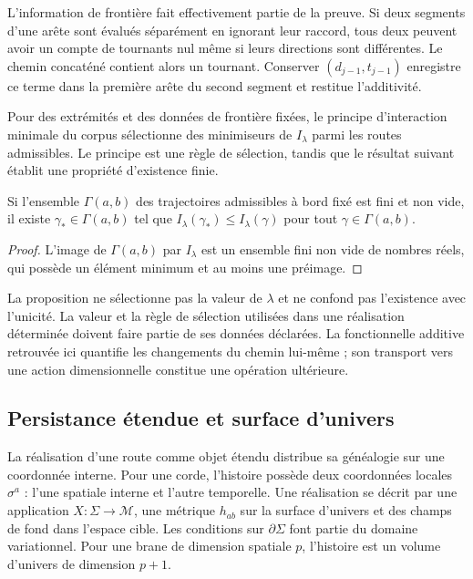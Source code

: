 L’information de frontière fait effectivement partie de la preuve.
Si deux segments d’une arête sont évalués séparément
en ignorant leur raccord, tous deux peuvent avoir un compte
de tournants nul même si leurs directions sont différentes. Le
chemin concaténé contient alors un tournant. Conserver
\((d_{j-1},t_{j-1})\) enregistre ce terme dans la première
arête du second segment et restitue l’additivité.

Pour des extrémités et des données de frontière fixées, le principe
d’interaction minimale du corpus sélectionne des minimiseurs de
\(I_\lambda\) parmi les routes admissibles. Le principe
est une règle de sélection, tandis que le résultat
suivant établit une propriété d’existence finie.

\begin{proposition}
Si l’ensemble \(\Gamma(a,b)\) des trajectoires admissibles
à bord fixé est fini et non vide, il existe
\(\gamma_*\in\Gamma(a,b)\) tel que
\(I_\lambda(\gamma_*)\leq I_\lambda(\gamma)\)
pour tout \(\gamma\in\Gamma(a,b)\).
\end{proposition}
\begin{proof}
L’image de \(\Gamma(a,b)\) par \(I_\lambda\) est
un ensemble fini non vide de nombres réels, qui possède
un élément minimum et au moins une préimage.
\end{proof}

La proposition ne sélectionne pas la valeur de \(\lambda\)
et ne confond pas l’existence avec l’unicité. La valeur et la règle
de sélection utilisées dans une réalisation déterminée
doivent faire partie de ses données déclarées. La fonctionnelle
additive retrouvée ici quantifie les changements du chemin
lui-même ; son transport vers une action dimensionnelle constitue
une opération ultérieure.

\subsection{Persistance étendue et surface d’univers}

La réalisation d’une route comme objet étendu distribue
sa généalogie sur une coordonnée interne. Pour une corde,
l’histoire possède deux coordonnées locales \(\sigma^a\) :
l’une spatiale interne et l’autre temporelle. Une réalisation se
décrit par une application \(X:\Sigma\to\mathcal M\), une
métrique \(h_{ab}\) sur la surface d’univers et des champs
de fond dans l’espace cible. Les conditions sur
\(\partial\Sigma\) font partie du domaine variationnel.
Pour une brane de dimension spatiale \(p\), l’histoire
est un volume d’univers de dimension \(p+1\).

